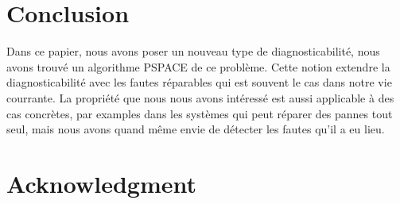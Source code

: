 \documentclass[conference]{IEEEtran}
\begin{document}
%





\section{Conclusion}
Dans ce papier, nous avons poser un nouveau type de diagnosticabilit\'e, nous 
avons trouv\'e un algorithme PSPACE de ce probl\`eme. Cette notion extendre la diagnosticabilit\'e avec les fautes r\'eparables qui est souvent le cas dans notre vie courrante. La propri\'et\'e que nous nous avons int\'eress\'e est aussi applicable \`a des cas concr\`etes, par examples dans les syst\`emes qui peut r\'eparer des pannes tout seul, mais nous avons quand m\^eme envie de d\'etecter les fautes qu'il a eu lieu.






\section*{Acknowledgment}
\end{document}
